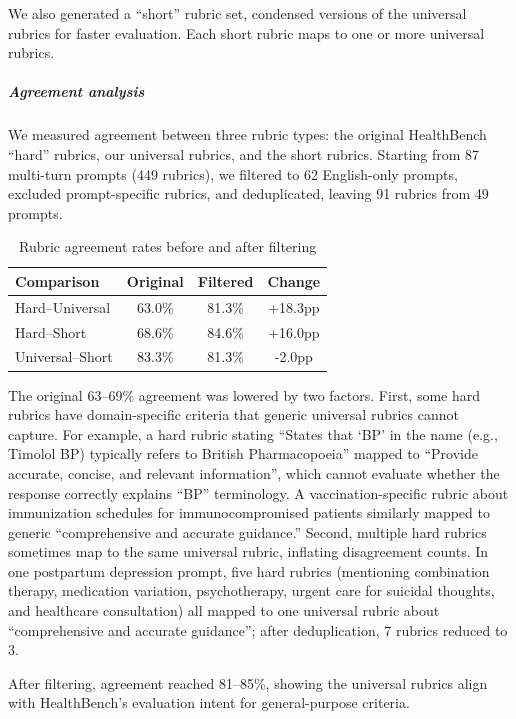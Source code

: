 We also generated a ``short'' rubric set, condensed versions of the universal rubrics for faster evaluation. Each short rubric maps to one or more universal rubrics.

\subparagraph{Agreement analysis}

We measured agreement between three rubric types: the original HealthBench ``hard'' rubrics, our universal rubrics, and the short rubrics. Starting from 87 multi-turn prompts (449 rubrics), we filtered to 62 English-only prompts, excluded prompt-specific rubrics, and deduplicated, leaving 91 rubrics from 49 prompts.

\begin{table}[h]
\centering
\begin{tabular}{|l|c|c|c|}
\hline
\textbf{Comparison} & \textbf{Original} & \textbf{Filtered} & \textbf{Change} \\
\hline
Hard--Universal & 63.0\% & 81.3\% & +18.3pp \\
Hard--Short & 68.6\% & 84.6\% & +16.0pp \\
Universal--Short & 83.3\% & 81.3\% & -2.0pp \\
\hline
\end{tabular}
\caption{Rubric agreement rates before and after filtering}
\end{table}

The original 63--69\% agreement was lowered by two factors. First, some hard rubrics have domain-specific criteria that generic universal rubrics cannot capture. For example, a hard rubric stating ``States that `BP' in the name (e.g., Timolol BP) typically refers to British Pharmacopoeia'' mapped to ``Provide accurate, concise, and relevant information'', which cannot evaluate whether the response correctly explains ``BP'' terminology. A vaccination-specific rubric about immunization schedules for immunocompromised patients similarly mapped to generic ``comprehensive and accurate guidance.'' Second, multiple hard rubrics sometimes map to the same universal rubric, inflating disagreement counts. In one postpartum depression prompt, five hard rubrics (mentioning combination therapy, medication variation, psychotherapy, urgent care for suicidal thoughts, and healthcare consultation) all mapped to one universal rubric about ``comprehensive and accurate guidance''; after deduplication, 7 rubrics reduced to 3.

After filtering, agreement reached 81--85\%, showing the universal rubrics align with HealthBench's evaluation intent for general-purpose criteria.

